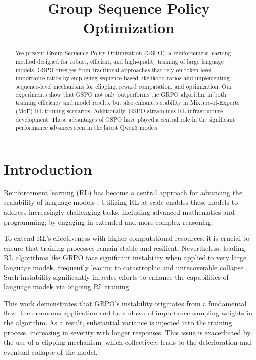 \title{Group Sequence Policy Optimization}

\begin{abstract}
We present Group Sequence Policy Optimization (GSPO), a reinforcement learning method designed for robust, efficient, and high-quality training of large language models. GSPO diverges from traditional approaches that rely on token-level importance ratios by employing sequence-based likelihood ratios and implementing sequence-level mechanisms for clipping, reward computation, and optimization. Our experiments show that GSPO not only outperforms the GRPO algorithm in both training efficiency and model results, but also enhances stability in Mixture-of-Experts (MoE) RL training scenarios. Additionally, GSPO streamlines RL infrastructure development. These advantages of GSPO have played a central role in the significant performance advances seen in the latest Qwen3 models.
\end{abstract}

\section{Introduction}
\label{sec:intro}

Reinforcement learning (RL) has become a central approach for advancing the scalability of language models \citep{o1,dpsk-r1,qwq32b,qwen3}. Utilizing RL at scale enables these models to address increasingly challenging tasks, including advanced mathematics and programming, by engaging in extended and more complex reasoning.

To extend RL's effectiveness with higher computational resources, it is crucial to ensure that training processes remain stable and resilient. Nevertheless, leading RL algorithms like GRPO \citep{grpo} face significant instability when applied to very large language models, frequently leading to catastrophic and unrecoverable collapse \citep{qwen3, minimax-m1}. Such instability significantly impedes efforts to enhance the capabilities of language models via ongoing RL training.

This work demonstrates that GRPO's instability originates from a fundamental flaw: the erroneous application and breakdown of importance sampling weights in the algorithm. As a result, substantial variance is injected into the training process, increasing in severity with longer responses. This issue is exacerbated by the use of a clipping mechanism, which collectively leads to the deterioration and eventual collapse of the model.

